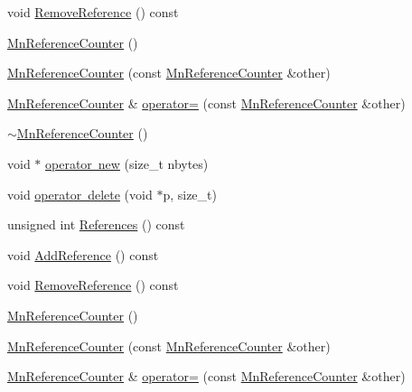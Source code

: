 \begin{DoxyCompactItemize}
void \mbox{\hyperlink{classROOT_1_1Minuit2_1_1MnReferenceCounter_a243db2ef8fc1fab0a29ea1c83aececab}{Remove\+Reference}} () const
\item 
\mbox{\hyperlink{classROOT_1_1Minuit2_1_1MnReferenceCounter_a9d841e3e0752316d6f4988b995d834b8}{Mn\+Reference\+Counter}} ()
\item 
\mbox{\hyperlink{classROOT_1_1Minuit2_1_1MnReferenceCounter_ac12866f9e41be0b9f943326772eee89a}{Mn\+Reference\+Counter}} (const \mbox{\hyperlink{classROOT_1_1Minuit2_1_1MnReferenceCounter}{Mn\+Reference\+Counter}} \&other)
\item 
\mbox{\hyperlink{classROOT_1_1Minuit2_1_1MnReferenceCounter}{Mn\+Reference\+Counter}} \& \mbox{\hyperlink{classROOT_1_1Minuit2_1_1MnReferenceCounter_a6a952f3f15d5dcfa10647c9df13a7caa}{operator=}} (const \mbox{\hyperlink{classROOT_1_1Minuit2_1_1MnReferenceCounter}{Mn\+Reference\+Counter}} \&other)
\item 
\mbox{\hyperlink{classROOT_1_1Minuit2_1_1MnReferenceCounter_ab78e13c79097fd8f5983dada7fab2f3d}{$\sim$\+Mn\+Reference\+Counter}} ()
\item 
void $\ast$ \mbox{\hyperlink{classROOT_1_1Minuit2_1_1MnReferenceCounter_af7e9fdee3f67cac68328bbd05f6f2958}{operator new}} (size\+\_\+t nbytes)
\item 
void \mbox{\hyperlink{classROOT_1_1Minuit2_1_1MnReferenceCounter_a792b5f277bb7df7c032c603eed5ae6f9}{operator delete}} (void $\ast$p, size\+\_\+t)
\item 
unsigned int \mbox{\hyperlink{classROOT_1_1Minuit2_1_1MnReferenceCounter_a8c4e8a4427e3f5eeaad4001a364f8a5a}{References}} () const
\item 
void \mbox{\hyperlink{classROOT_1_1Minuit2_1_1MnReferenceCounter_afab040d933d93fd7f86b3c14a8d1910d}{Add\+Reference}} () const
\item 
void \mbox{\hyperlink{classROOT_1_1Minuit2_1_1MnReferenceCounter_a243db2ef8fc1fab0a29ea1c83aececab}{Remove\+Reference}} () const
\item 
\mbox{\hyperlink{classROOT_1_1Minuit2_1_1MnReferenceCounter_a9d841e3e0752316d6f4988b995d834b8}{Mn\+Reference\+Counter}} ()
\item 
\mbox{\hyperlink{classROOT_1_1Minuit2_1_1MnReferenceCounter_ac12866f9e41be0b9f943326772eee89a}{Mn\+Reference\+Counter}} (const \mbox{\hyperlink{classROOT_1_1Minuit2_1_1MnReferenceCounter}{Mn\+Reference\+Counter}} \&other)
\item 
\mbox{\hyperlink{classROOT_1_1Minuit2_1_1MnReferenceCounter}{Mn\+Reference\+Counter}} \& \mbox{\hyperlink{classROOT_1_1Minuit2_1_1MnReferenceCounter_a6a952f3f15d5dcfa10647c9df13a7caa}{operator=}} (const \mbox{\hyperlink{classROOT_1_1Minuit2_1_1MnReferenceCounter}{Mn\+Reference\+Counter}} \&other)

\end{DoxyCompactItemize}
